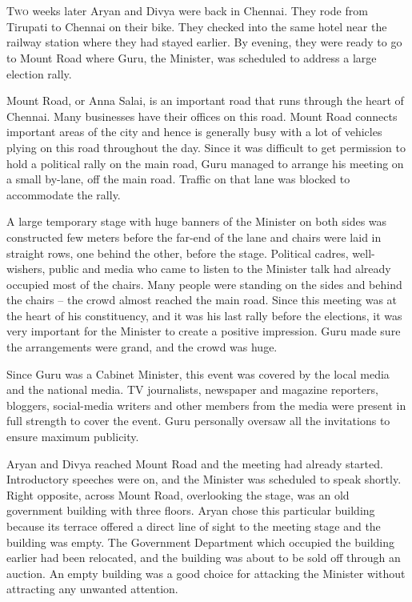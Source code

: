 \chapter{}

\lettrine{T}{wo} weeks later Aryan and Divya were back in Chennai. They rode from Tirupati to
Chennai on their bike. They checked into the same hotel near the railway station
where they had stayed earlier. By evening, they were ready to go to Mount Road
where Guru, the Minister, was scheduled to address a large election rally.

Mount Road, or Anna Salai, is an important road that runs through the heart of
Chennai. Many businesses have their offices on this road. Mount Road connects
important areas of the city and hence is generally busy with a lot of vehicles
plying on this road throughout the day. Since it was difficult to get permission
to hold a political rally on the main road, Guru managed to arrange his meeting
on a small by-lane, off the main road. Traffic on that lane was blocked to
accommodate the rally.

A large temporary stage with huge banners of the Minister on both sides was
constructed few meters before the far-end of the lane and chairs were laid in
straight rows, one behind the other, before the stage. Political cadres,
well-wishers, public and media who came to listen to the Minister talk had
already
occupied most of the chairs. Many people were standing on the sides and behind
the chairs – the crowd almost reached the main road. Since this meeting was at
the heart of his constituency, and it was his last rally before the elections,
it was very important for the Minister to create a positive impression. Guru
made sure the arrangements were grand, and the crowd was huge.

Since Guru was a Cabinet Minister, this event was covered by the local media and
the national media. TV journalists, newspaper and magazine reporters, bloggers,
social-media writers and other members from the media were present in full
strength to cover the event. Guru personally oversaw all the invitations to
ensure maximum publicity.

Aryan and Divya reached Mount Road and the meeting had already started.
Introductory speeches were on, and the Minister was scheduled to speak shortly.
Right opposite, across Mount Road, overlooking the stage, was an old government
building with three floors. Aryan chose this particular building because its
terrace offered a direct line of sight to the meeting stage and the building was
empty. The Government Department which occupied the building earlier had been
relocated, and the building was about to be sold off through an auction. An empty
building was a good choice for attacking the Minister without attracting any
unwanted attention.

